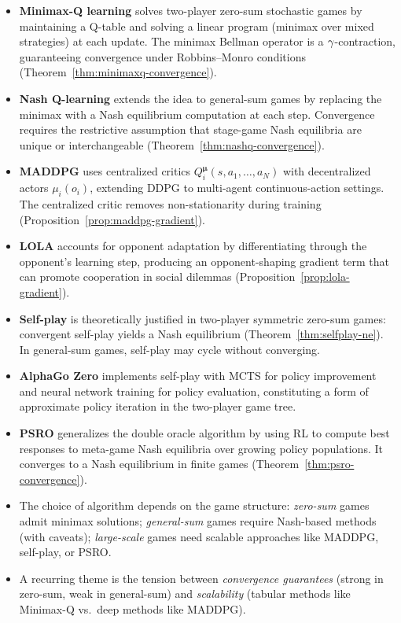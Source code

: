 \documentclass[11pt,a4paper]{article}
\begin{document}
\begin{itemize}
  \item \textbf{Minimax-Q learning} solves two-player zero-sum
    stochastic games by maintaining a Q-table and solving a linear
    program (minimax over mixed strategies) at each update.  The minimax
    Bellman operator is a $\gamma$-contraction, guaranteeing
    convergence under Robbins--Monro conditions
    (Theorem~\ref{thm:minimaxq-convergence}).

  \item \textbf{Nash Q-learning} extends the idea to general-sum games
    by replacing the minimax with a Nash equilibrium computation at each
    step.  Convergence requires the restrictive assumption that
    stage-game Nash equilibria are unique or interchangeable
    (Theorem~\ref{thm:nashq-convergence}).

  \item \textbf{MADDPG} uses centralized critics
    $Q_i^{\boldsymbol{\mu}}(s, a_1, \ldots, a_N)$ with decentralized
    actors $\mu_i(o_i)$, extending DDPG to multi-agent continuous-action
    settings.  The centralized critic removes non-stationarity during
    training (Proposition~\ref{prop:maddpg-gradient}).

  \item \textbf{LOLA} accounts for opponent adaptation by
    differentiating through the opponent's learning step, producing an
    opponent-shaping gradient term that can promote cooperation in social
    dilemmas (Proposition~\ref{prop:lola-gradient}).

  \item \textbf{Self-play} is theoretically justified in two-player
    symmetric zero-sum games: convergent self-play yields a Nash
    equilibrium (Theorem~\ref{thm:selfplay-ne}).  In general-sum games,
    self-play may cycle without converging.

  \item \textbf{AlphaGo Zero} implements self-play with MCTS for policy
    improvement and neural network training for policy evaluation,
    constituting a form of approximate policy iteration in the
    two-player game tree.

  \item \textbf{PSRO} generalizes the double oracle algorithm by using
    RL to compute best responses to meta-game Nash equilibria over
    growing policy populations.  It converges to a Nash equilibrium in
    finite games (Theorem~\ref{thm:psro-convergence}).

  \item The choice of algorithm depends on the game structure:
    \emph{zero-sum} games admit minimax solutions; \emph{general-sum}
    games require Nash-based methods (with caveats); \emph{large-scale}
    games need scalable approaches like MADDPG, self-play, or PSRO.

  \item A recurring theme is the tension between \emph{convergence
    guarantees} (strong in zero-sum, weak in general-sum) and
    \emph{scalability} (tabular methods like Minimax-Q vs.\ deep methods
    like MADDPG).
\end{itemize}
\end{document}
